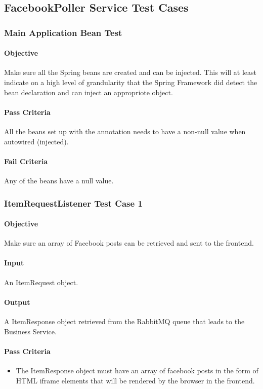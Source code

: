 \documentclass[hidelinks,english]{article}
\begin{document}
		\subsection{FacebookPoller Service Test Cases}
			\subsubsection{Main Application Bean Test}\label{facebookapplicationbeanstest}
				\paragraph{Objective} Make sure all the Spring beans are created and can be injected. This will at least indicate on a high level of grandularity that the Spring Framework did detect the bean declaration and can inject an appropriote object.
				\paragraph{Pass Criteria} All the beans set up with the \emph{\@Bean} annotation needs to have a non-null value when autowired (injected).
				\paragraph{Fail Criteria} Any of the beans have a null value.
				
			\subsubsection{ItemRequestListener Test Case 1}\label{facebookitemlistenertest1}
				\paragraph{Objective} Make sure an array of Facebook posts can be retrieved and sent to the frontend.
				\paragraph{Input} An ItemRequest object.
				\paragraph{Output} A ItemResponse object retrieved from the RabbitMQ queue that leads to the Business Service.
				\paragraph{Pass Criteria}
				\begin{itemize}
					\item The ItemResponse object must have an array of facebook posts in the form of HTML iframe elements that will be rendered by the browser in the frontend.
				\end{itemize}
\end{document}
